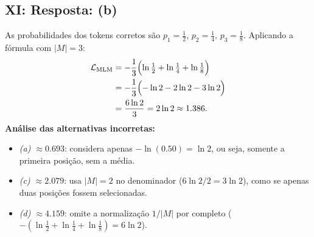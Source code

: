 \documentclass{dlproblemset}
\begin{document}
\subsection*{XI: Resposta: (b)}
As probabilidades dos tokens corretos são $p_1 = \tfrac{1}{2}$,
$p_2 = \tfrac{1}{4}$, $p_3 = \tfrac{1}{8}$. Aplicando a fórmula com $|M| = 3$:
\begin{align*}
  \mathcal{L}_{\text{MLM}}
    &= -\frac{1}{3}\Bigl(\ln\tfrac{1}{2} + \ln\tfrac{1}{4} + \ln\tfrac{1}{8}\Bigr) \\
    &= -\frac{1}{3}\Bigl(-\ln 2 - 2\ln 2 - 3\ln 2\Bigr) \\
    &= \frac{6\ln 2}{3} = 2\ln 2 \approx 1.386.
\end{align*}
\textbf{Análise das alternativas incorretas:}
\begin{itemize}
  \item \emph{(a) $\approx 0.693$}: considera apenas $-\ln(0.50) = \ln 2$,
        ou seja, somente a primeira posição, sem a média.
  \item \emph{(c) $\approx 2.079$}: usa $|M| = 2$ no denominador ($6\ln 2 / 2 = 3\ln 2$),
        como se apenas duas posições fossem selecionadas.
  \item \emph{(d) $\approx 4.159$}: omite a normalização $1/|M|$ por completo
        ($-(\ln\tfrac{1}{2}+\ln\tfrac{1}{4}+\ln\tfrac{1}{8}) = 6\ln 2$).
\end{itemize}
\end{document}
